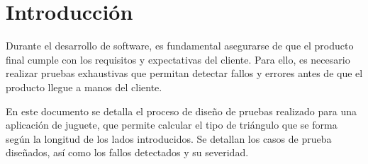 \chapter{Introducción}
Durante el desarrollo de software, es fundamental asegurarse de que el producto
final cumple con los requisitos y expectativas del cliente. Para ello, es
necesario realizar pruebas exhaustivas que permitan detectar fallos y errores
antes de que el producto llegue a manos del cliente.

En este documento se detalla el proceso de diseño de pruebas realizado para una
aplicación de juguete, que permite calcular el tipo de triángulo que se forma
según la longitud de los lados introducidos. Se detallan los casos de prueba
diseñados, así como los fallos detectados y su severidad.
